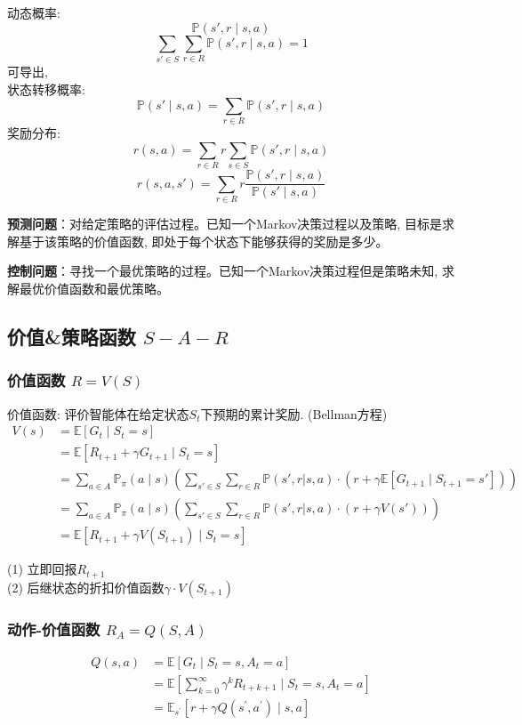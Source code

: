 \documentclass{article}
\newcommand{\env}[2]{\begin{#1}#2\end{#1}}
\begin{document}
        动态概率:
            $$\mathbb{P}(s', r \mid s, a)$$
            $$\sum_{s' \in S} \sum_{r \in R} \mathbb{P}(s', r \mid s, a) = 1$$
        可导出,\\
        状态转移概率:
            $$\mathbb{P}(s' \mid s,a) = \sum_{r \in R} \mathbb{P}(s', r \mid s, a)$$
        奖励分布:
            $$r(s, a) = \sum_{r \in R} r \sum_{s \in S} \mathbb{P}(s', r \mid s, a)$$
            $$r(s, a, s') = \sum_{r \in R} r \frac{\mathbb{P}(s', r \mid s, a)}{\mathbb{P}(s' \mid s, a)}$$
            
        \textbf{预测问题}：对给定策略的评估过程。已知一个Markov决策过程以及策略, 目标是求解基于该策略的价值函数, 即处于每个状态下能够获得的奖励是多少。
        
        \textbf{控制问题}：寻找一个最优策略的过程。已知一个Markov决策过程但是策略未知, 求解最优价值函数和最优策略。

        
    \subsection{价值\&策略函数 $S-A-R$}
        \subsubsection{价值函数 $R = V(S)$}
            价值函数: 评价智能体在给定状态$S_t$下预期的累计奖励. (Bellman方程)
            \env{align*}{
                V(s) 
                &= \mathbb{E} \left[G_t \mid S_t=s\right] \tag{定义}\\
                &= \mathbb{E} \left[R_{t+1} + \gamma G_{t+1} \mid S_t=s\right] \tag{代换}\\
                &= \sum_{a \in A} \mathbb{P}_\pi(a \mid s) \left( \sum_{s' \in S} \sum_{r \in R} \mathbb{P}(s', r | s, a)\cdot \left(r + \gamma \mathbb{E} \left[G_{t+1} \mid S_{t+1} = s'\right]\right) \right) \tag{期望公式}\\
                &= \sum_{a \in A} \mathbb{P}_\pi(a \mid s) \left( \sum_{s' \in S} \sum_{r \in R} \mathbb{P}(s', r | s, a)\cdot \left(r + \gamma V(s') \right) \right) \tag{代换}\\
                &= \mathbb{E} \left[R_{t+1} + \gamma V(S_{t+1}) \mid S_t=s\right]
            }

            (1) 立即回报$R_{t+1}$\\
        	(2) 后继状态的折扣价值函数$\gamma \cdot V(S_{t+1})$
        
        \subsubsection{动作-价值函数 $R_A = Q(S,A)$}
            \env{align*}{
                Q(s,a) 
                &= \mathbb{E}\left[G_t \mid S_t=s, A_t = a\right]\\
                &= \mathbb{E}\left[\sum_{k=0}^\infty \gamma^k R_{t+k+1} \mid S_t = s, A_t = a\right]\\
                &= \mathbb{E}_{s^{\prime}}\left[r+\gamma Q\left(s^{\prime}, a^{\prime}\right) \mid s, a\right]
            }
            
\end{document}
